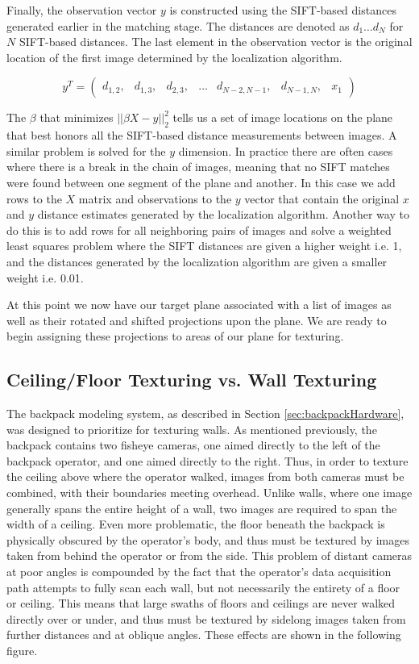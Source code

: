 \documentclass[10pt,twocolumn,letterpaper]{article}
\begin{document}
Finally, the observation vector $y$ is constructed using the
SIFT-based distances generated earlier in the matching stage. The
distances are denoted as $d_1 \dots d_N$ for $N$ SIFT-based
distances. The last element in the observation vector is the original
location of the first image determined by the localization algorithm.

\[
y^T =
\begin{pmatrix}
  d_{1,2}, &d_{1,3}, &d_{2,3}, &\hdots &d_{N-2,N-1}, &d_{N-1,N}, &x_1
\end{pmatrix}
\]

The $\beta$ that minimizes $||\beta X - y||_2^2$ tells us a set of
image locations on the plane that best honors all the SIFT-based
distance measurements between images. A similar problem is solved for
the $y$ dimension. In practice there are often cases where there is a
break in the chain of images, meaning that no SIFT matches were found
between one segment of the plane and another. In this case we add rows
to the $X$ matrix and observations to the $y$ vector that contain the
original $x$ and $y$ distance estimates generated by the localization
algorithm. Another way to do this is to add rows for all neighboring
pairs of images and solve a weighted least squares problem where the
SIFT distances are given a higher weight i.e. 1, and the distances
generated by the localization algorithm are given a smaller weight
i.e. 0.01.

At this point we now have our target plane associated with a list of
images as well as their rotated and shifted projections upon the
plane. We are ready to begin assigning these projections to areas of
our plane for texturing.



\subsection{Ceiling/Floor Texturing vs. Wall Texturing}
\label{sec:whydifferent}
The backpack modeling system, as described in Section
\ref{sec:backpackHardware}, was designed to prioritize for texturing
walls. As mentioned previously, the backpack contains two fisheye
cameras, one aimed directly to the left of the backpack operator, and
one aimed directly to the right. Thus, in order to texture the ceiling
above where the operator walked, images from both cameras must be
combined, with their boundaries meeting overhead. Unlike walls, where
one image generally spans the entire height of a wall, two images are
required to span the width of a ceiling. Even more problematic, the
floor beneath the backpack is physically obscured by the operator's
body, and thus must be textured by images taken from behind the
operator or from the side. This problem of distant cameras at poor
angles is compounded by the fact that the operator's data acquisition
path attempts to fully scan each wall, but not necessarily the
entirety of a floor or ceiling. This means that large swaths of floors
and ceilings are never walked directly over or under, and thus must be
textured by sidelong images taken from further distances and at
oblique angles. These effects are shown in the following figure.
\end{document}
